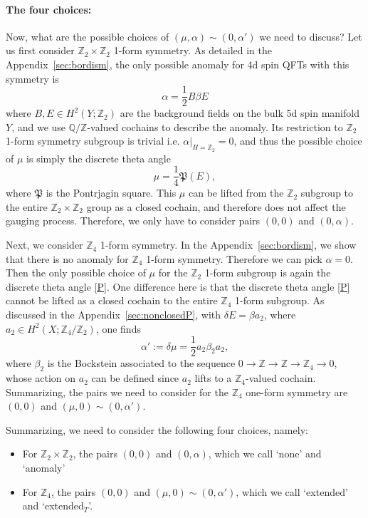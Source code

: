 \documentclass[12pt]{article}
\numberwithin{equation}{section}
\def\bQ{\mathbb{Q}}
\def\bZ{\mathbb{Z}}
\def\fP{\mathfrak{P}}
\begin{document}
\paragraph{The four choices:}
Now, what are the possible choices of $(\mu,\alpha)\sim(0,\alpha')$ we need to discuss?
Let us first consider $\bZ_2\times \bZ_2$ 1-form symmetry.
As detailed in the Appendix~\ref{sec:bordism}, the only possible anomaly for 4d spin QFTs with this symmetry is \begin{equation}
\alpha=%
\frac12  B\beta E  \label{anom}
\end{equation} where $B,E\in H^2(Y;\bZ_2)$ are the background fields on the bulk 5d spin manifold $Y$,
and we use $\bQ/\bZ$-valued cochains to describe the anomaly.
Its restriction to $\bZ_2$ 1-form symmetry subgroup is trivial i.e. $\alpha|_{H=\bZ_2} = 0$,
and thus the possible choice of $\mu$ is simply the discrete theta angle \begin{equation}
\mu =%
 \frac14 \fP(E),\label{P}
\end{equation}
where $\fP$ is the Pontrjagin square.
This $\mu$ can be lifted from the $\bZ_2$ subgroup to the entire $\bZ_2\times \bZ_2$ group as a closed cochain, 
and therefore does not affect the gauging process.
Therefore, we only have to consider pairs $(0,0)$ and $(0,\alpha)$.

Next, we consider $\bZ_4$ 1-form symmetry.
In the Appendix~\ref{sec:bordism}, we show that there is no anomaly for $\bZ_4$ 1-form symmetry.
Therefore we can pick $\alpha=0$. Then the only possible choice of $\mu$ for the $\bZ_2$ 1-form subgroup is again the discrete theta angle \eqref{P}.
One difference here is that the discrete theta angle \eqref{P} cannot be lifted as a closed cochain to the entire $\bZ_4$ 1-form subgroup.
As discussed in the Appendix~\ref{sec:nonclosedP}, with $\delta E=\beta a_2$,
where $a_2\in H^2(X;\bZ_4/\bZ_2)$,
one finds \begin{equation}
\alpha':=\delta \mu = %
\frac12 a_2 \beta_2 a_2,\label{anom'}
\end{equation}
where $\beta_2$ is the Bockstein associated to the sequence $0\to \bZ\to \bZ \to \bZ_4\to 0$,
whose action on $a_2$ can be defined since $a_2$ lifts to a $\bZ_4$-valued cochain.
Summarizing, the pairs  we need to consider for the $\bZ_4$ one-form symmetry are $(0,0)$ and $(\mu,0)\sim (0,\alpha')$. 

\def\Textended{extended$_T$}
Summarizing,  we need to consider the following four choices, namely:
\begin{itemize}
\item For $\bZ_2\times \bZ_2$, the pairs $(0,0)$ and $(0,\alpha)$, which we call `none' and `anomaly'
\item For $\bZ_4$, the pairs $(0,0)$ and $(\mu,0)\sim (0,\alpha')$, which we call `extended' and `\Textended'.
\end{itemize}
\end{document}
